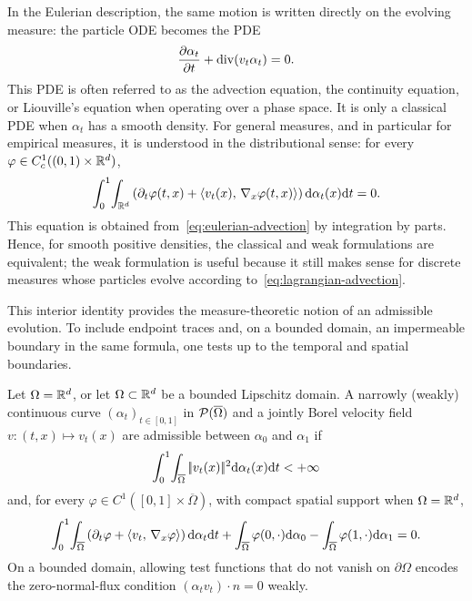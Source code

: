In the Eulerian description, the same motion is written directly on the evolving measure: the particle ODE becomes the PDE
\begin{equation}
    \frac{\partial \alpha_t}{\partial t} + \operatorname{div}(v_t \alpha_t) = 0. \label{eq:eulerian-advection}
\end{equation}
This PDE is often referred to as the advection equation, the continuity equation, or Liouville's equation when operating over a phase space. It is only a classical PDE when $\alpha_t$ has a smooth density. For general measures, and in particular for empirical measures, it is understood in the distributional sense: for every $\varphi\in C_c^1((0,1)\times\mathbb{R}^d)$,
\begin{equation}\label{eq:eulerian-advection-weak}
	\int_0^1\!\int_{\mathbb{R}^d}
	\left(\partial_t\varphi(t,x)+\langle v_t(x),\,\nabla_x\varphi(t,x)\rangle\right)
	\mathrm{d}\alpha_t(x)\mathrm{d} t
	=
	0.
\end{equation}
This equation is obtained from~\eqref{eq:eulerian-advection} by integration by parts. Hence, for smooth positive densities, the classical and weak formulations are equivalent; the weak formulation is useful because it still makes sense for discrete measures whose particles evolve according to~\eqref{eq:lagrangian-advection}.

This interior identity provides the measure-theoretic notion of an admissible evolution. To include endpoint traces and, on a bounded domain, an impermeable boundary in the same formula, one tests up to the temporal and spatial boundaries.
\begin{defn}\label{def-admissible-continuity-evolution}
Let $\Omega=\mathbb{R}^d$, or let $\Omega\subset\mathbb{R}^d$ be a bounded Lipschitz domain. A narrowly (weakly) continuous curve $(\alpha_t)_{t\in[0,1]}$ in $\mathcal{P}(\overline\Omega)$ and a jointly Borel velocity field $v:(t,x)\mapsto v_t(x)$ are admissible between $\alpha_0$ and $\alpha_1$ if
\[
\int_0^1\!\int_{\overline\Omega}|\!| v_t(x) |\!|^2\mathrm{d}\alpha_t(x)\mathrm{d} t<+\infty
\]
and, for every $\varphi\in C^1([0,1]\times\overline\Omega)$, with compact spatial support when $\Omega=\mathbb{R}^d$,
\begin{equation}\label{eq-continuity-endpoint-no-flux}
\int_0^1\!\int_{\overline\Omega}
\left(\partial_t\varphi+\langle v_t,\,\nabla_x\varphi\rangle\right)\mathrm{d}\alpha_t\mathrm{d} t
+\int_{\overline\Omega}\varphi(0,\cdot)\mathrm{d}\alpha_0
-\int_{\overline\Omega}\varphi(1,\cdot)\mathrm{d}\alpha_1=0.
\end{equation}
On a bounded domain, allowing test functions that do not vanish on $\partial\Omega$ encodes the zero-normal-flux condition $(\alpha_t v_t)\cdot n=0$ weakly.
\end{defn}


